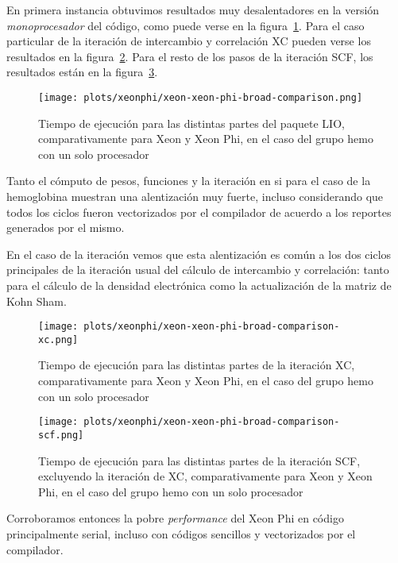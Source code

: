 En primera instancia obtuvimos resultados muy desalentadores en la versi\'on
\textit{monoprocesador} del c\'odigo, como puede verse en la figura~\ref{fig:prelim-xeon-phi}.
Para el caso particular de la iteraci\'on de intercambio y correlaci\'on XC pueden
verse los resultados en la figura~\ref{fig:prelim-xeon-phi-xc}. Para el resto de
los pasos de la iteraci\'on SCF, los resultados est\'an en la figura~\ref{fig:prelim-xeon-phi-scf}.

\begin{figure}[htbp]
   \centering
   \texttt{[image: plots/xeonphi/xeon-xeon-phi-broad-comparison.png]}
   \caption{Tiempo de ejecuci\'on para las distintas partes del paquete LIO,
   comparativamente para Xeon y Xeon Phi, en el caso del grupo hemo con un solo procesador}
   \label{fig:prelim-xeon-phi}
\end{figure}

Tanto el c\'omputo de pesos, funciones y la iteraci\'on en si para el caso de la
hemoglobina muestran una alentizaci\'on muy fuerte, incluso considerando que
todos los ciclos fueron vectorizados por el compilador de acuerdo a los reportes
generados por el mismo.

En el caso de la iteraci\'on vemos que esta alentizaci\'on es com\'un a los dos
ciclos principales de la iteraci\'on usual del c\'alculo de intercambio y
correlaci\'on: tanto para el c\'alculo de la densidad electr\'onica como la
actualizaci\'on de la matriz de Kohn Sham.

\begin{figure}[htbp]
   \centering
   \texttt{[image: plots/xeonphi/xeon-xeon-phi-broad-comparison-xc.png]}
   \caption{Tiempo de ejecuci\'on para las distintas partes de la iteraci\'on XC,
   comparativamente para Xeon y Xeon Phi, en el caso del grupo hemo con un solo procesador}
   \label{fig:prelim-xeon-phi-xc}
\end{figure}

\begin{figure}[htbp]
   \centering
   \texttt{[image: plots/xeonphi/xeon-xeon-phi-broad-comparison-scf.png]}
   \caption{Tiempo de ejecuci\'on para las distintas partes de la iteraci\'on SCF,
   excluyendo la iteraci\'on de XC, comparativamente para Xeon y Xeon Phi, en el
   caso del grupo hemo con un solo procesador}
   \label{fig:prelim-xeon-phi-scf}
\end{figure}

Corroboramos entonces la pobre \textit{performance} del Xeon Phi en c\'odigo
principalmente serial, incluso con c\'odigos sencillos y vectorizados por el
compilador.

